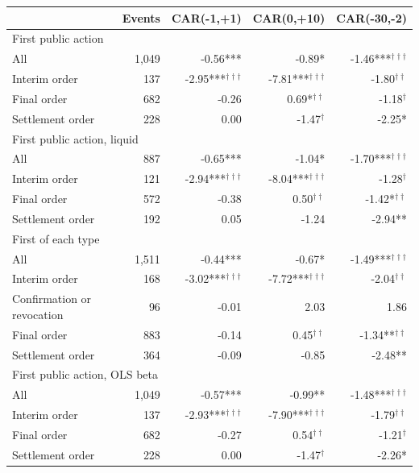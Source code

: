 \begin{tabular*}{\textwidth}[]{l@{\extracolsep\fill}rrrr}
\toprule
 & Events & CAR(-1,+1) & CAR(0,+10) & CAR(-30,-2)\\
\midrule
\multicolumn{5}{l}{First public action}\\
All & 1,049 & -0.56*** & -0.89* & -1.46***$^{\dagger\dagger\dagger}$\\
Interim order & 137 & -2.95***$^{\dagger\dagger\dagger}$ & -7.81***$^{\dagger\dagger\dagger}$ & -1.80$^{\dagger\dagger}$\\
Final order & 682 & -0.26 & 0.69*$^{\dagger\dagger}$ & -1.18$^{\dagger}$\\
Settlement order & 228 & 0.00 & -1.47$^{\dagger}$ & -2.25*\\
\midrule
\multicolumn{5}{l}{First public action, liquid}\\
All & 887 & -0.65*** & -1.04* & -1.70***$^{\dagger\dagger\dagger}$\\
Interim order & 121 & -2.94***$^{\dagger\dagger\dagger}$ & -8.04***$^{\dagger\dagger\dagger}$ & -1.28$^{\dagger}$\\
Final order & 572 & -0.38 & 0.50$^{\dagger\dagger}$ & -1.42*$^{\dagger\dagger}$\\
Settlement order & 192 & 0.05 & -1.24 & -2.94**\\
\midrule
\multicolumn{5}{l}{First of each type}\\
All & 1,511 & -0.44*** & -0.67* & -1.49***$^{\dagger\dagger\dagger}$\\
Interim order & 168 & -3.02***$^{\dagger\dagger\dagger}$ & -7.72***$^{\dagger\dagger\dagger}$ & -2.04$^{\dagger\dagger}$\\
Confirmation or revocation & 96 & -0.01 & 2.03 & 1.86\\
Final order & 883 & -0.14 & 0.45$^{\dagger\dagger}$ & -1.34**$^{\dagger\dagger}$\\
Settlement order & 364 & -0.09 & -0.85 & -2.48**\\
\midrule
\multicolumn{5}{l}{First public action, OLS beta}\\
All & 1,049 & -0.57*** & -0.99** & -1.48***$^{\dagger\dagger\dagger}$\\
Interim order & 137 & -2.93***$^{\dagger\dagger\dagger}$ & -7.90***$^{\dagger\dagger\dagger}$ & -1.79$^{\dagger\dagger}$\\
Final order & 682 & -0.27 & 0.54$^{\dagger\dagger}$ & -1.21$^{\dagger}$\\
Settlement order & 228 & 0.00 & -1.47$^{\dagger}$ & -2.26*\\
\bottomrule
\end{tabular*}
